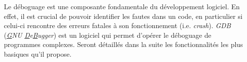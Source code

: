 \documentclass[../../../main.tex]{subfiles}
\begin{document}
Le déboguage est une composante fondamentale du développement logiciel. En effet, il est crucial de pouvoir identifier les fautes dans un code, en particulier si celui-ci rencontre des erreurs fatales à son fonctionnement (i.e. \textit{crash}). \textit{GDB} (\textit{\underline{G}NU \underline{D}e\underline{B}ugger}) est un logiciel qui permet d'opérer le déboguage de programmes complexes. Seront détaillés dans la suite les fonctionnalités les plus basiques qu'il propose.
\end{document}
